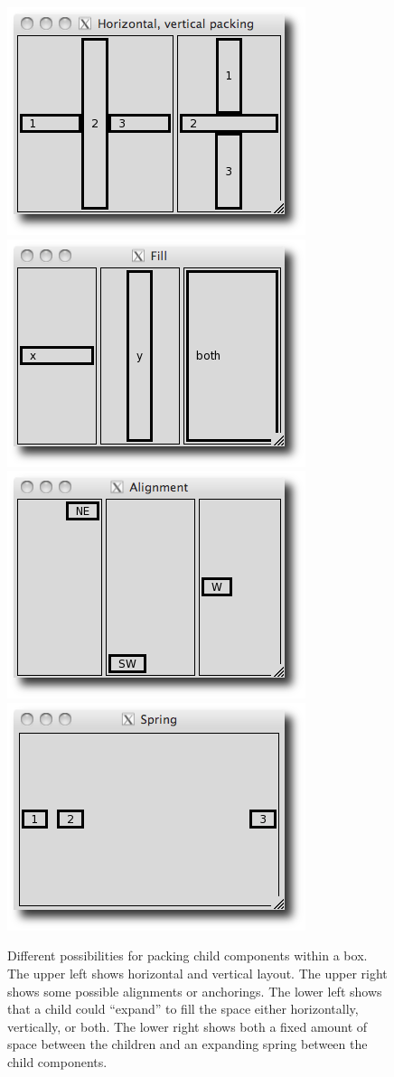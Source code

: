 \begin{figure}
  \centering
  \includegraphics[width=.40\textwidth]{fig-basics-hor-ver}
  \includegraphics[width=.40\textwidth]{fig-basics-fill}\\
  \includegraphics[width=.40\textwidth]{fig-basics-alignment}
  \includegraphics[width=.40\textwidth]{fig-basics-spring}
  \caption{
    Different possibilities for packing child components within
    a box. 
    The upper left shows horizontal and vertical layout.
    The upper right shows some possible alignments or anchorings.
    The lower left shows that a child could ``expand'' to fill the space
    either horizontally, vertically, or both.
    The lower right shows both a fixed amount of space between the
    children and an expanding spring between the child components.  }
  \label{fig:GUI:box-possibilities}
\end{figure}

